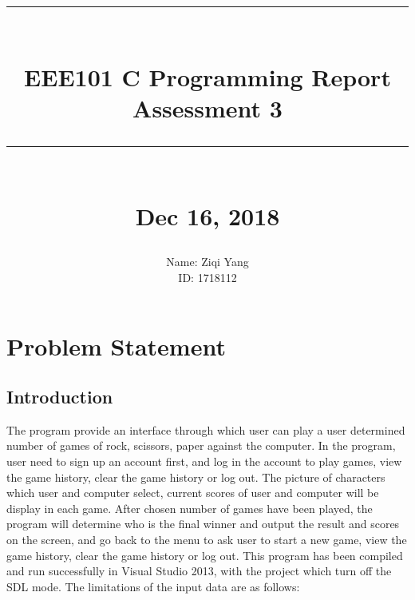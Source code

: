 \documentclass[12pt]{article}
\newcommand{\HRule}[1]{\rule{\linewidth}{#1}}
\begin{document}
	
	\title{ \normalsize \textsc{}
		\\ [2.0cm]
		\HRule{0.5pt} \\
		\LARGE \textbf{EEE101 C Programming Report\\Assessment 3}
		\HRule{2pt} \\ [0.5cm]
		\normalsize Dec 16, 2018 \vspace*{5\baselineskip}}
	
	\date{}
	
	\author{
		Name: Ziqi Yang\\
		ID: 1718112\\
	}
	
	\maketitle
	\newpage
	\tableofcontents
	\newpage
	
	
	\section{Problem Statement}
	
	\subsection{Introduction}
	The program provide an interface through which user can play a user determined number of games of rock, scissors, paper against the computer. In the program, user need to sign up an account first, and log in the account to play games, view the game history, clear the game history or log out. The picture of characters which user and computer select, current scores of user and computer will be display in each game. After chosen number of games have been played, the program will determine who is the final winner and output the result and scores on the screen, and go back to the menu to ask user to start a new game, view the game history, clear the game history or log out. This program has been compiled and run successfully in Visual Studio 2013, with the project which turn off the SDL mode. The limitations of the input data are as follows:
	
\end{document}
